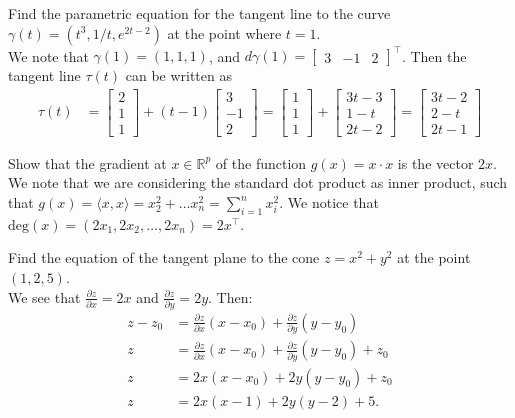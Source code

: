 \documentclass[12pt]{book}
\newcommand{\R}{\mathbb{R}}
\newenvironment{exercise}[2][Exercise]{\begin{trivlist}
\item[\hskip \labelsep {\bfseries #1}\hskip \labelsep {\bfseries #2.}]}{\end{trivlist}}
\begin{document}
\begin{exercise}{9.4.3}
    Find the parametric equation for the tangent line to the curve $\gamma(t) = \left( t^3, 1/t, e^{2t-2}\right)$ at the point where $t=1$. \\

    We note that $\gamma(1) = (1,1,1)$, and $d\gamma(1) = \begin{bmatrix} 3 & -1 & 2 \end{bmatrix}^\intercal$. Then the tangent line $\tau(t)$ can be written as
        \begin{align*}
            \tau(t) &= \begin{bmatrix} 2 \\ 1\\1 \end{bmatrix} + (t-1) \begin{bmatrix} 3 \\ -1 \\ 2 \end{bmatrix} = \begin{bmatrix} 1 \\ 1\\1 \end{bmatrix} + \begin{bmatrix} 3 t - 3 \\ 1 - t\\ 2 t - 2 \end{bmatrix} = \begin{bmatrix} 3t -2 \\ 2- t \\ 2 t - 1 \end{bmatrix}
        \end{align*}
\end{exercise}


\begin{exercise}{9.4.6}
    Show that the gradient  at $x \in \R^p$ of the function $g(x) = x \cdot x$ is the vector $2x$. \\

    We note that we are considering the standard dot product as inner product, such that $g(x) = \langle x, x \rangle = x_2^2 + \hdots x_n^2 = \sum_{i=1}^n x_i^2$. We notice that $\text{deg}(x) = (2 x_1, 2x_2, \hdots, 2 x_n) = 2 x^\intercal$.
\end{exercise}


\begin{exercise}{9.4.11}
    Find the equation of the tangent plane to the cone $z = x^2 + y^2$ at the point $(1,2,5)$. \\
    
    We see that $\frac{\partial z}{\partial x}= 2x$ and $\frac{\partial z}{\partial y} = 2y$. Then:
    \begin{align*}
    z - z_0 &= \frac{\partial z}{\partial x}(x-x_0) + \frac{\partial z}{\partial y} (y-y_0)\\
    z &= \frac{\partial z}{\partial x}(x-x_0) + \frac{\partial z}{\partial y} (y-y_0 ) + z_0 \\
    z &= 2 x (x - x_0) + 2 y (y-y_0) + z_0 \\
    z &= 2 x (x -1) + 2 y(y-2) + 5.
    \end{align*}
\end{exercise}
\end{document}
